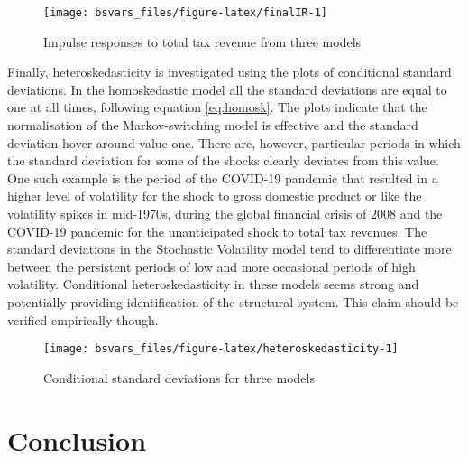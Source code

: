 \documentclass[
  nojss]{jss}
\begin{document}
\begin{CodeChunk}
\begin{figure}

{\centering \texttt{[image: bsvars\_files/figure-latex/finalIR-1]} 

}

\caption[Impulse responses to total tax revenue from three models]{Impulse responses to total tax revenue from three models}\label{fig:finalIR}
\end{figure}
\end{CodeChunk}

Finally, heteroskedasticity is investigated using the plots of
conditional standard deviations. In the homoskedastic model all the
standard deviations are equal to one at all times, following equation
\eqref{eq:homosk}. The plots indicate that the normalisation of the
Markov-switching model is effective and the standard deviation hover
around value one. There are, however, particular periods in which the
standard deviation for some of the shocks clearly deviates from this
value. One such example is the period of the COVID-19 pandemic that
resulted in a higher level of volatility for the shock to gross domestic
product or like the volatility spikes in mid-1970s, during the global
financial crisis of 2008 and the COVID-19 pandemic for the unanticipated
shock to total tax revenues. The standard deviations in the Stochastic
Volatility model tend to differentiate more between the persistent
periods of low and more occasional periods of high volatility.
Conditional heteroskedasticity in these models seems strong and
potentially providing identification of the structural system. This
claim should be verified empirically though.

\begin{CodeChunk}
\begin{figure}

{\centering \texttt{[image: bsvars\_files/figure-latex/heteroskedasticity-1]} 

}

\caption[Conditional standard deviations for three models]{Conditional standard deviations for three models}\label{fig:heteroskedasticity}
\end{figure}
\end{CodeChunk}

\section{Conclusion}
\end{document}
